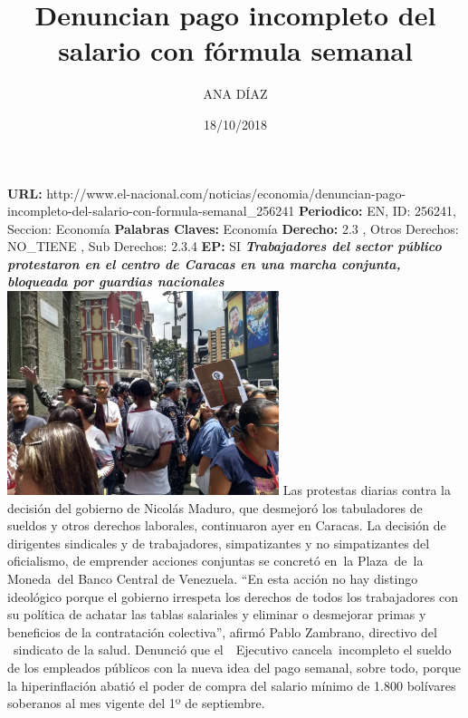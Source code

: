 \documentclass{article}%
\title{\textbf{Denuncian pago incompleto del salario con fórmula semanal}}%
\author{ANA DÍAZ}%
\date{18/10/2018}%
\begin{document}
%
\normalsize%
\maketitle%
\textbf{URL: }%
http://www.el{-}nacional.com/noticias/economia/denuncian{-}pago{-}incompleto{-}del{-}salario{-}con{-}formula{-}semanal\_256241\newline%
%
\textbf{Periodico: }%
EN, %
ID: %
256241, %
Seccion: %
Economía\newline%
%
\textbf{Palabras Claves: }%
Economía\newline%
%
\textbf{Derecho: }%
2.3%
, Otros Derechos: %
NO\_TIENE%
, Sub Derechos: %
2.3.4%
\newline%
%
\textbf{EP: }%
SI\newline%
\newline%
%
\textbf{\textit{Trabajadores del sector público protestaron en el centro de Caracas en una marcha conjunta, bloqueada por guardias nacionales}}%
\newline%
\newline%
%
\includegraphics[width=300px]{158.jpg}%
\newline%
%
Las protestas diarias contra la decisión del gobierno de Nicolás Maduro, que desmejoró los tabuladores de sueldos y otros derechos laborales, continuaron ayer en Caracas. La decisión de dirigentes sindicales y de trabajadores, simpatizantes y no simpatizantes del oficialismo, de emprender acciones conjuntas se concretó en~la Plaza~de~la Moneda~del Banco Central de Venezuela.%
\newline%
%
“En esta acción no hay distingo ideológico porque el gobierno irrespeta los derechos de todos los trabajadores con su política de achatar las tablas salariales y eliminar o desmejorar primas y beneficios de la contratación colectiva”, afirmó Pablo Zambrano, directivo del ~sindicato de la salud.%
\newline%
%
Denunció que el~~Ejecutivo cancela~incompleto el sueldo de los empleados públicos con la nueva idea del pago semanal, sobre todo, porque la hiperinflación abatió el poder de compra del salario mínimo de 1.800 bolívares soberanos al mes vigente del 1º de septiembre.%
\end{document}
